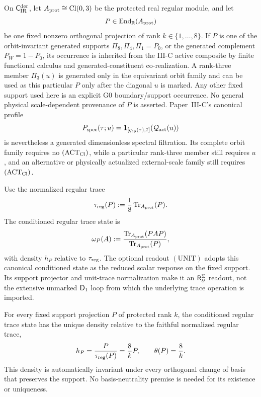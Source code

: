 \documentclass[12pt,a4paper]{article}
\begin{document}
\begin{definition}
\label{p3:def:active-support-response}
On \(\mathsf C_{\rm IR}^{\rm der}\), let
\(A_{\rm prot}\cong\operatorname{Cl}(0,3)\) be the protected real regular module, and let
\[
 P\in\operatorname{End}_{\mathbb R}(A_{\rm prot})
\]
be one fixed nonzero orthogonal projection of rank
\(k\in\{1,\ldots,8\}\).  If \(P\) is one of the orbit-invariant generated
supports \(\Pi_8,\Pi_4,\Pi_1=P_0\), or the generated complement
\(P_W=1-P_0\), its occurrence is inherited from the III-C active composite by
finite functional calculus and generated-constituent co-realization.  A
rank-three member \(\Pi_3(u)\) is generated only in the equivariant orbit
family and can be used as this particular \(P\) only after the diagonal
\(u\) is marked.  Any
other fixed support used here is an explicit G0 boundary/support occurrence.
No general physical scale-dependent provenance of \(P\) is asserted.
Paper~III-C's canonical profile
\[
 P_{\rm spec}(\tau;u)
 =\mathbf1_{[q_{\rm sp}(\tau),7]}(\mathcal Q_{\rm act}(u))
\]
is nevertheless a generated dimensionless spectral filtration.  Its complete
orbit family requires no \((\mathrm{ACT}_{\rm Cl})\), while a particular
rank-three member still requires \(u\), and an alternative or physically
actualized external-scale family still requires \((\mathrm{ACT}_{\rm Cl})\).

Use the normalized regular trace
\[
 \tau_{\rm reg}(P):=\frac18\operatorname{Tr}_{A_{\rm prot}}(P).
\]
The conditioned regular trace state is
\[
 \omega_P(A):=\frac{\operatorname{Tr}_{A_{\rm prot}}(PAP)}{\operatorname{Tr}_{A_{\rm prot}}(P)},
\]
with density \(h_P\) relative to \(\tau_{\rm reg}\).  The optional readout
\((\mathrm{UNIT})\) adopts this canonical conditioned state as the reduced
scalar response on the fixed support.  Its support projector and unit-trace
normalization make it an \(\mathsf R_{\partial}^{\Sigma}\) readout, not the extensive unmarked
\(\mathsf{D}_1\) loop from which the underlying trace operation is imported.
\end{definition}

\begin{lemma}
\label{p3:lem:unit-trace-forces-reciprocal-active-fraction}
For every fixed support projection \(P\) of protected rank \(k\), the conditioned regular trace
state has the unique density relative to the faithful normalized regular trace,
\[
h_P=\frac{P}{\tau_{\rm reg}(P)}=\frac{8}{k}P,
\qquad
\theta(P)=\frac8k.
\]
This density is automatically invariant under every orthogonal change of basis
that preserves the support.  No basis-neutrality premise is needed for its
existence or uniqueness.
\end{lemma}
\end{document}
